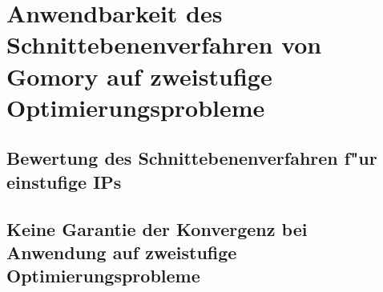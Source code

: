 \section{Anwendbarkeit des Schnittebenenverfahren von Gomory auf zweistufige Optimierungsprobleme}

\subsection{Bewertung des Schnittebenenverfahren f"ur einstufige IPs}

\subsection{Keine Garantie der Konvergenz bei Anwendung auf zweistufige Optimierungsprobleme}
